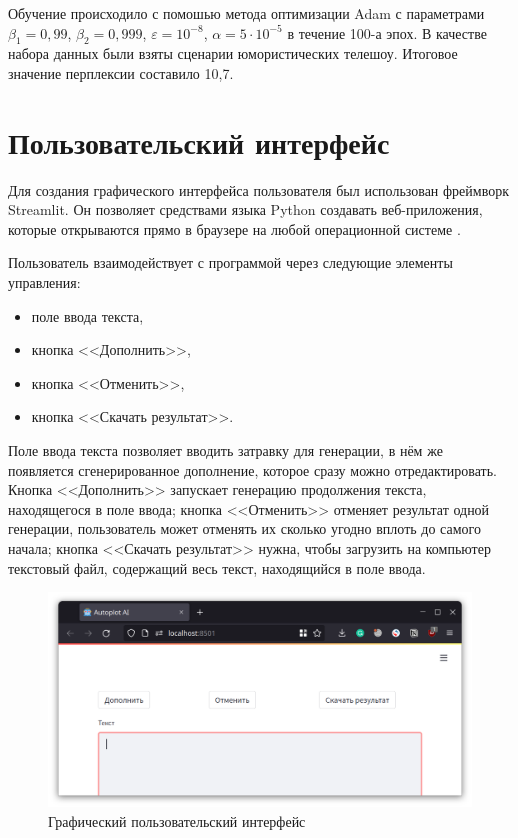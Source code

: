 Обучение происходило с помошью метода оптимизации Adam с параметрами $\beta_1=0,99$, $\beta_2=0,999$, $\varepsilon=10^{-8}$, $\alpha=5\cdot10^{-5}$ в течение 100-а эпох. В качестве набора данных были взяты сценарии юмористических телешоу. Итоговое значение перплексии составило 10,7.

\section{Пользовательский интерфейс}

Для создания графического интерфейса пользователя был использован фреймворк Streamlit. Он позволяет средствами языка Python создавать веб-приложения, которые открываются прямо в браузере на любой операционной системе \cite{doc:streamlit}.

Пользователь взаимодействует с программой через следующие элементы управления:
\begin{itemize}
    \item поле ввода текста,
    \item кнопка <<Дополнить>>,
    \item кнопка <<Отменить>>,
    \item кнопка <<Скачать результат>>.
\end{itemize}

Поле ввода текста позволяет вводить затравку для генерации, в нём же появляется сгенерированное дополнение, которое сразу можно отредактировать. Кнопка <<Дополнить>> запускает генерацию продолжения текста, находящегося в поле ввода; кнопка <<Отменить>> отменяет результат одной генерации, пользователь может отменять их сколько угодно вплоть до самого начала; кнопка <<Скачать результат>> нужна, чтобы загрузить на компьютер текстовый файл, содержащий весь текст, находящийся в поле ввода.

\begin{figure}[H]
    \centering
    \includegraphics[width=\textwidth]{../inc/images/gui.png}
    \caption{Графический пользовательский интерфейс}
    \label{fig:gui}
\end{figure}


